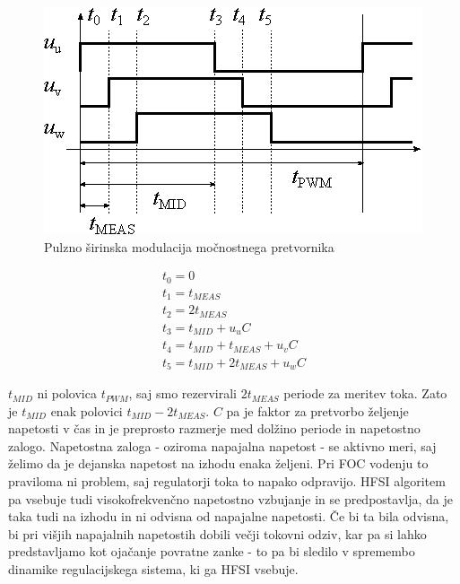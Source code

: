 \documentclass[a4paper,twoside,openright,12pt,slovene]{book}
\begin{document}
\begin{figure}[!htbp]
    \centering
    \includegraphics[width=1\columnwidth]{Slike/Inkscape/PWM.eps}
    \caption{\label{PWM} Pulzno širinska modulacija močnostnega pretvornika }
\end{figure}

\begin{equation} \label{izracunPWM}
\begin{gathered}
    t_0 = 0  \\
    t_1 = t_{MEAS}  \\
    t_2 = 2t_{MEAS}  \\
    t_3 = t_{MID} + u_uC  \\
    t_4 = t_{MID} + t_{MEAS} + u_vC \\
    t_5 = t_{MID} + 2t_{MEAS} + u_wC
\end{gathered}
\end{equation}

$t_{MID}$ ni polovica $t_{PWM}$, saj smo rezervirali $2t_{MEAS}$ periode za meritev toka. Zato je $t_{MID}$ enak polovici $t_{MID} - 2t_{MEAS}$. $C$ pa je faktor za pretvorbo željenje napetosti v
čas in je preprosto razmerje med dolžino periode in napetostno zalogo. Napetostna zaloga - oziroma napajalna napetost - se aktivno meri, saj želimo da je dejanska napetost na izhodu enaka željeni. Pri
FOC vodenju to praviloma ni problem, saj regulatorji toka to napako odpravijo. HFSI algoritem pa vsebuje tudi visokofrekvenčno napetostno vzbujanje in se predpostavlja, da je taka tudi na izhodu in ni
odvisna od napajalne napetosti. Če bi ta bila odvisna, bi pri višjih napajalnih napetostih dobili večji tokovni odziv, kar pa si lahko predstavljamo kot ojačanje povratne zanke - to pa bi sledilo v
spremembo dinamike regulacijskega sistema, ki ga HFSI vsebuje.
\end{document}
